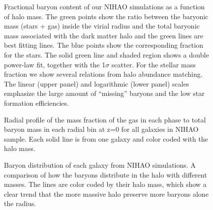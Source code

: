 \documentclass[useAMS,usenatbib]{mn2e}
\begin{document}


\begin{figure}
\centerline{
}
\caption{Fractional baryon content of our NIHAO simulations 
  as a function of halo
  mass. The green points show the ratio between the baryonic mass
  (stars + gas) inside the virial radius and the total baryonic mass
  associated with the dark matter halo and the green lines are best
  fitting lines. The blue points show the
  corresponding fraction for the stars. The solid green line and
  shaded region shows a double power-law fit, together with the
  1$\sigma$ scatter. For the stellar mass fraction we show several
  relations from halo abundance matching.    The linear (upper panel)
  and logarithmic (lower panel) scales emphasize the large amount of
  ``missing'' baryons and the low star formation efficiencies.}
\label{fig:budget}
\end{figure}

\begin{figure*}
\centerline{
}
\caption{Radial profile of the mass fraction of the gas in each phase
         to total baryon mass in each radial bin 
         at z=0 for all galaxies in NIHAO sample.
         Each solid line is from one galaxy and color coded with
         the halo mass.}
\label{fig:corona}
\end{figure*}


\begin{figure}
\centerline{
}
\caption{Baryon distribution of each galaxy from NIHAO simulations.
  A comparison of how the baryons distribute in the halo with 
  different masses. 
  The lines are color coded by their halo mass, which show a clear
  trend that the more massive halo preserve more baryons alone
  the radius.}
\label{fig:rps}
\end{figure}
\end{document}
